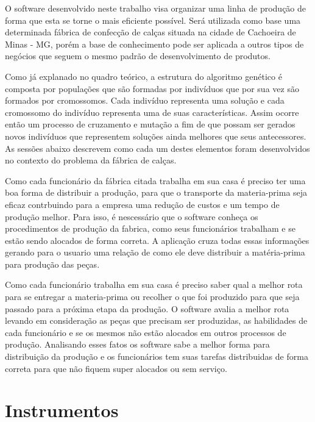 \par O software desenvolvido neste trabalho visa organizar uma linha de produção
de forma que esta se torne o mais eficiente possível. Será utilizada como
base uma determinada fábrica de confecção de calças situada na cidade de
Cachoeira de Minas - MG, porém a base de conhecimento pode ser aplicada a outros
tipos de negócios que seguem o mesmo padrão de desenvolvimento de produtos.

\par Como já explanado no quadro teórico, a estrutura do algoritmo genético é composta
por populações que são formadas por indivíduos que por sua vez são formados por cromossomos.
Cada indivíduo representa uma solução e cada cromossomo do indivíduo representa uma de suas características. 
Assim ocorre então um processo de cruzamento e mutação a fim de que possam ser gerados novos 
indivíduos que representem soluções ainda melhores que seus antecessores.
As sessões abaixo descrevem como cada um destes elementos foram desenvolvidos no contexto do problema da fábrica de calças.

\par Como cada funcionário da fábrica citada trabalha em sua casa é preciso ter
uma boa forma de distribuir a produção, para que o transporte da materia-prima
seja eficaz contrbuindo para a empresa uma redução de custos e um tempo de
produção melhor.
Para isso, é nescessário que o software conheça os procedimentos de
produção da fabrica, como seus funcionários trabalham e se estão sendo alocados
de forma correta. A aplicação cruza todas essas informações gerando para o
usuario uma relação de como ele deve distribuir a matéria-prima para produção
das peças.

\par Como cada funcionário trabalha em sua casa é preciso saber qual a
melhor rota para se entregar a materia-prima ou recolher o que foi produzido
para que seja passado para a próxima etapa da produção. O software avalia a
melhor rota levando em consideração as peças que precisam ser produzidas, as
habilidades de cada funcionário e se os mesmos não estão alocados em outros
processos de produção. Analisando esses fatos os software sabe a melhor forma
para distribuição da produção e os funcionários tem
suas tarefas distribuidas de forma correta para que não fiquem super alocados ou
sem serviço.


\section{Instrumentos}

